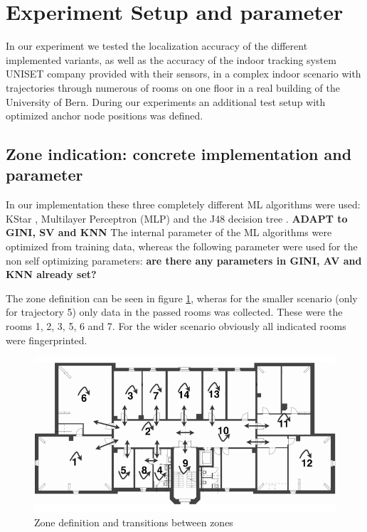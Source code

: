 
\section{Experiment Setup and parameter}
In our experiment we tested the localization accuracy of the different implemented variants, as well as the accuracy of the indoor tracking system UNISET company provided with their sensors, in a complex indoor scenario with trajectories through numerous of rooms on one floor in a real building of the University of Bern. During our experiments an additional test setup with optimized anchor node positions was defined.

\subsection{Zone indication: concrete implementation and parameter}
In our implementation these three completely different ML algorithms were used: KStar \cite{KStar}, Multilayer Perceptron (MLP) \cite{MLP} and the J48 decision tree \cite{J48}.  \textbf{ADAPT to GINI, SV and KNN}
The internal parameter of the ML algorithms were optimized from training data, whereas the following parameter were used for the non self optimizing parameters: \textbf{are there any parameters in GINI, AV and KNN already set?}

The zone definition can be seen in figure \ref{fig:zone_definition}, wheras for the smaller scenario (only for trajectory 5) only data in the passed rooms was collected. These were the rooms 1, 2, 3, 5, 6 and 7.  For the wider scenario obviously all indicated rooms were fingerprinted.

\begin{figure}[th]
\centering
\includegraphics[width=1.0\textwidth]{Figures/zone_definition}
\decoRule
\caption[Zone Definition]{Zone definition and transitions between zones}
\label{fig:zone_definition}
\end{figure}

